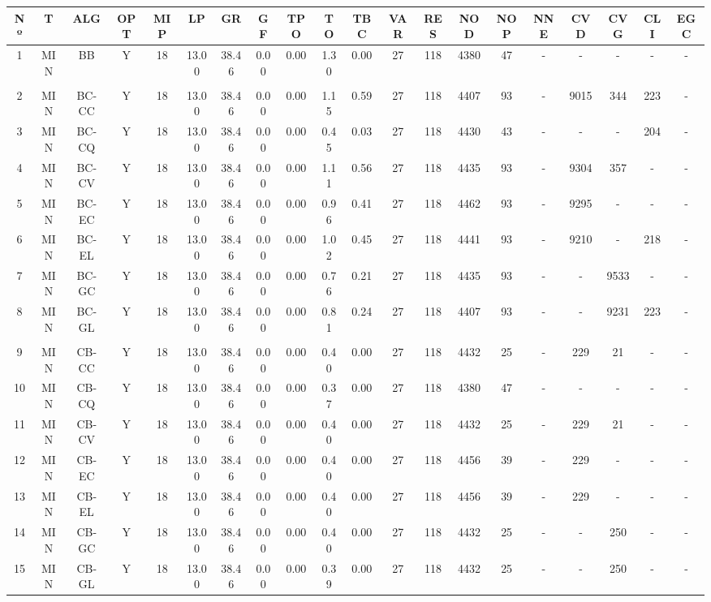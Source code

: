 {
\footnotesize\centering
\hspace*{-5mm}\begin{tabular}{ *{19}{c|} c }
\hline
\textbf{Nº} & \textbf{T} & \textbf{ALG} & \textbf{OPT} & \textbf{MIP} & \textbf{LP} & \textbf{GR} & \textbf{GF} & \textbf{TPO} & \textbf{TO} & \textbf{TBC} & \textbf{VAR} & \textbf{RES} & \textbf{NOD} & \textbf{NOP} & \textbf{NNE} & \textbf{CVD} & \textbf{CVG} & \textbf{CLI} & \textbf{EGC}\\
\hline
1 & MIN & BB & Y & 18 & 13.00 & 38.46 & 0.00 & 0.00 & 1.30 & 0.00 & 27 & 118 & 4380 & 47 & - & - & - & - & -\\
\hline
\multicolumn{20}{c}{}
\\
\hline
2 & MIN & BC-CC & Y & 18 & 13.00 & 38.46 & 0.00 & 0.00 & 1.15 & 0.59 & 27 & 118 & 4407 & 93 & - & 9015 & 344 & 223 & -\\
\hline
3 & MIN & BC-CQ & Y & 18 & 13.00 & 38.46 & 0.00 & 0.00 & 0.45 & 0.03 & 27 & 118 & 4430 & 43 & - & - & - & 204 & -\\
\hline
4 & MIN & BC-CV & Y & 18 & 13.00 & 38.46 & 0.00 & 0.00 & 1.11 & 0.56 & 27 & 118 & 4435 & 93 & - & 9304 & 357 & - & -\\
\hline
5 & MIN & BC-EC & Y & 18 & 13.00 & 38.46 & 0.00 & 0.00 & 0.96 & 0.41 & 27 & 118 & 4462 & 93 & - & 9295 & - & - & -\\
\hline
6 & MIN & BC-EL & Y & 18 & 13.00 & 38.46 & 0.00 & 0.00 & 1.02 & 0.45 & 27 & 118 & 4441 & 93 & - & 9210 & - & 218 & -\\
\hline
7 & MIN & BC-GC & Y & 18 & 13.00 & 38.46 & 0.00 & 0.00 & 0.76 & 0.21 & 27 & 118 & 4435 & 93 & - & - & 9533 & - & -\\
\hline
8 & MIN & BC-GL & Y & 18 & 13.00 & 38.46 & 0.00 & 0.00 & 0.81 & 0.24 & 27 & 118 & 4407 & 93 & - & - & 9231 & 223 & -\\
\hline
\multicolumn{20}{c}{}
\\
\hline
9 & MIN & CB-CC & Y & 18 & 13.00 & 38.46 & 0.00 & 0.00 & 0.40 & 0.00 & 27 & 118 & 4432 & 25 & - & 229 & 21 & - & -\\
\hline
10 & MIN & CB-CQ & Y & 18 & 13.00 & 38.46 & 0.00 & 0.00 & 0.37 & 0.00 & 27 & 118 & 4380 & 47 & - & - & - & - & -\\
\hline
11 & MIN & CB-CV & Y & 18 & 13.00 & 38.46 & 0.00 & 0.00 & 0.40 & 0.00 & 27 & 118 & 4432 & 25 & - & 229 & 21 & - & -\\
\hline
12 & MIN & CB-EC & Y & 18 & 13.00 & 38.46 & 0.00 & 0.00 & 0.40 & 0.00 & 27 & 118 & 4456 & 39 & - & 229 & - & - & -\\
\hline
13 & MIN & CB-EL & Y & 18 & 13.00 & 38.46 & 0.00 & 0.00 & 0.40 & 0.00 & 27 & 118 & 4456 & 39 & - & 229 & - & - & -\\
\hline
14 & MIN & CB-GC & Y & 18 & 13.00 & 38.46 & 0.00 & 0.00 & 0.40 & 0.00 & 27 & 118 & 4432 & 25 & - & - & 250 & - & -\\
\hline
15 & MIN & CB-GL & Y & 18 & 13.00 & 38.46 & 0.00 & 0.00 & 0.39 & 0.00 & 27 & 118 & 4432 & 25 & - & - & 250 & - & -\\
\hline
\end{tabular}\\
\vspace{4mm}
}

